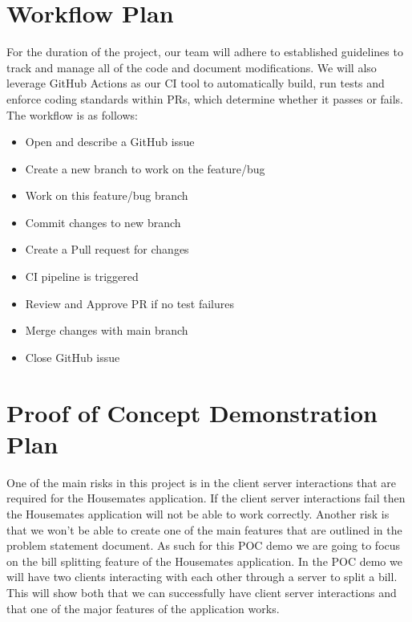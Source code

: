 \documentclass{article}
\begin{document}
\section{Workflow Plan}
    For the duration of the project, our team will adhere to established guidelines to track and manage all of the code and document modifications. We will also leverage GitHub Actions as our CI tool to automatically build, run tests and enforce coding standards within PRs, which determine whether it passes or fails. The workflow is as follows:
    \begin{itemize}
        \item Open and describe a GitHub issue
        \item Create a new branch to work on the feature/bug
        \item Work on this feature/bug branch
        \item Commit changes to new branch
        \item Create a Pull request for changes
        \item CI pipeline is triggered
        \item Review and Approve PR if no test failures
        \item Merge changes with main branch
        \item Close GitHub issue
    \end{itemize}
    

\section{Proof of Concept Demonstration Plan}
    One of the main risks in this project is in the client server interactions that are required for the Housemates application. If the client server interactions fail then the Housemates application will not be able to work correctly. Another risk is that we won't be able to create one of the main features that are outlined in the problem statement document. As such for this POC demo we are going to focus on  the bill splitting feature of the Housemates application. In the POC demo we will have two clients interacting with each other through a server to split a bill. This will show both that we can successfully have client server interactions and that one of the major features of the application works.
    
\end{document}
